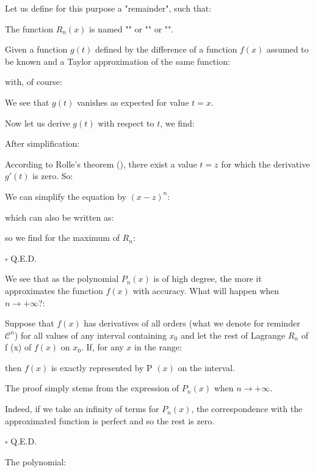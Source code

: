 	Let us define for this purpose a "remainder", such that:
	
	The function $R_n(x)$ is named "" or "" or "".
	
	\begin{dem}
	Given a function $g(t)$ defined by the difference of a function $f(x)$ assumed to be known and a Taylor approximation of the same function:
	
	with, of course:
	
	We see that $g (t)$ vanishes as expected for value $t=x$.
	
	Now let us derive $g(t)$ with respect to $t$, we find:
	
	After simplification:
	
	According to Rolle's theorem (), there exist a value $t=z$ for which the derivative $g'(t)$ is zero. So:
	
	We can simplify the equation by $(x-z)^n$:
	
	which can also be written as:
	
	so we find for the maximum of $R_n$:
	
	\begin{flushright}
		$\square$  Q.E.D.
	\end{flushright}
	\end{dem}
	We see that as the polynomial $P_n(x)$ is of high degree, the more it approximates the function $f (x)$ with accuracy. What will happen when $n\rightarrow +\infty$?:
	
	Suppose that $f (x)$ has derivatives of all orders (what we denote for reminder $\mathcal{C}^n$) for all values of any interval containing $x_0$ and let the rest of Lagrange $R_n$ of f (x) of $f(x)$ on $x_0$. If, for any $x$ in the range:
	
	then $f (x)$ is exactly represented by P $(x)$ on the interval.
	\begin{dem}
	The proof simply stems from the expression of $P_n(x)$ when $n\rightarrow +\infty$.
	
	Indeed, if we take an infinity of terms for $P_n(x)$, the correspondence with the approximated function is perfect and so the rest is zero.
	\begin{flushright}
		$\square$  Q.E.D.
	\end{flushright}
	\end{dem}
	The polynomial:
	
